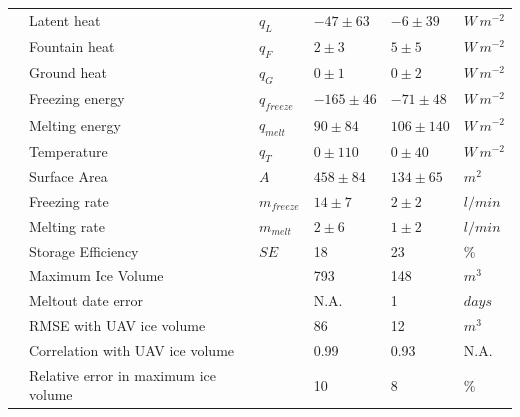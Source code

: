 \documentclass[utf8]{frontiersSCNS} %
\begin{document}
\begin{table}
\begin{tabular}{@{}|llllll|@{}}
		\multicolumn{1}{|l|}{} & Latent heat                          & $q_{L}  $       & $-47 \pm 63$  & $-6 \pm 39$   & $W\,m^{-2}$ \\
		\multicolumn{1}{|l|}{} & Fountain heat                        & $q_{F}  $       & $2 \pm 3$     & $5 \pm 5$     & $W\,m^{-2}$ \\
		\multicolumn{1}{|l|}{} & Ground heat                          & $q_{G}   $      & $0 \pm 1$     & $0 \pm 2$     & $W\,m^{-2}$ \\
		\multicolumn{1}{|l|}{} & Freezing energy                      & $q_{freeze} $   & $-165\pm 46$  & $-71 \pm 48$  & $W\,m^{-2}$ \\
		\multicolumn{1}{|l|}{} & Melting energy                       & $q_{melt}  $    & $90 \pm 84$   & $106\pm 140$  & $W\,m^{-2}$ \\
		\multicolumn{1}{|l|}{} & Temperature                          & $q_{T}  $       & $0 \pm 110$   & $0 \pm 40$    & $W\,m^{-2}$ \\
		\multicolumn{1}{|l|}{} & Surface Area                         & $A$             & $458 \pm 84$  & $134 \pm 65$  & $m^{2}$     \\\midrule
		\multicolumn{1}{|l|}{\multirow{4}{*}{\rotatebox[origin=c]{90}{AIR}}}

		                       & Freezing rate                        & $m_{freeze}$    & $14 \pm 7$    & $2 \pm 2$     & $l/min$     \\
		\multicolumn{1}{|l|}{} & Melting rate                         & $m_{melt}$      & $2 \pm 6$     & $1 \pm 2$     & $l/min$     \\
		\multicolumn{1}{|l|}{} & Storage Efficiency                   & $SE$            & 18            & 23
		                       & \%                                                                                                   \\
		\multicolumn{1}{|l|}{} & Maximum Ice Volume                   &                 & 793           & 148           & $m^{3}$     \\\midrule
		\multicolumn{1}{|l|}{\multirow{4}{*}{\rotatebox[origin=c]{90}{Model}}}
		                       & Meltout date error                   &                 & N.A.          & 1             & $days$      \\
		\multicolumn{1}{|l|}{} & RMSE with UAV ice volume             &                 & 86            & 12            & $m^{3}$     \\
		\multicolumn{1}{|l|}{} & Correlation with UAV ice volume      &                 & 0.99          & 0.93          & N.A.        \\
		\multicolumn{1}{|l|}{} & Relative error in maximum ice volume &                 & 10            & 8             & \%          \\\bottomrule
	\end{tabular}
\end{table}
\end{document}
